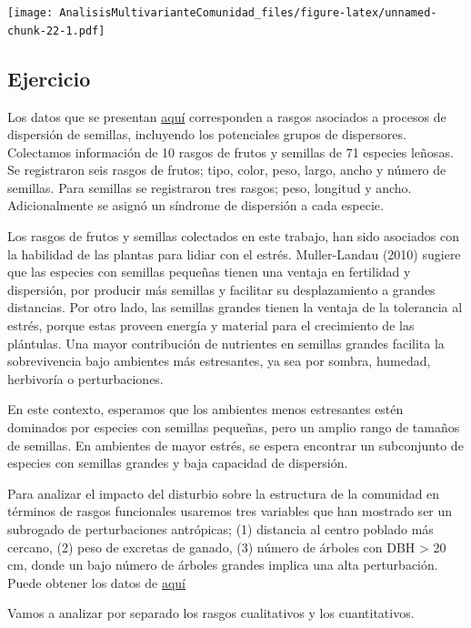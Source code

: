\documentclass[]{book}
\begin{document}
\texttt{[image: AnalisisMultivarianteComunidad\_files/figure-latex/unnamed-chunk-22-1.pdf]}

\subsection{Ejercicio}\label{ejercicio}

Los datos que se presentan
\href{https://github.com/Ciespinosa/AnalisisMultivariante/blob/gh-pages/TraitsVege.csv}{aquí}
corresponden a rasgos asociados a procesos de dispersión de semillas,
incluyendo los potenciales grupos de dispersores. Colectamos información
de 10 rasgos de frutos y semillas de 71 especies leñosas. Se registraron
seis rasgos de frutos; tipo, color, peso, largo, ancho y número de
semillas. Para semillas se registraron tres rasgos; peso, longitud y
ancho. Adicionalmente se asignó un síndrome de dispersión a cada
especie.

Los rasgos de frutos y semillas colectados en este trabajo, han sido
asociados con la habilidad de las plantas para lidiar con el estrés.
Muller-Landau (2010) sugiere que las especies con semillas pequeñas
tienen una ventaja en fertilidad y dispersión, por producir más semillas
y facilitar su desplazamiento a grandes distancias. Por otro lado, las
semillas grandes tienen la ventaja de la tolerancia al estrés, porque
estas proveen energía y material para el crecimiento de las plántulas.
Una mayor contribución de nutrientes en semillas grandes facilita la
sobrevivencia bajo ambientes más estresantes, ya sea por sombra,
humedad, herbivoría o perturbaciones.

En este contexto, esperamos que los ambientes menos estresantes estén
dominados por especies con semillas pequeñas, pero un amplio rango de
tamaños de semillas. En ambientes de mayor estrés, se espera encontrar
un subconjunto de especies con semillas grandes y baja capacidad de
dispersión.

Para analizar el impacto del disturbio sobre la estructura de la
comunidad en términos de rasgos funcionales usaremos tres variables que
han mostrado ser un subrogado de perturbaciones antrópicas; (1)
distancia al centro poblado más cercano, (2) peso de excretas de ganado,
(3) número de árboles con DBH \textgreater{} 20 cm, donde un bajo número
de árboles grandes implica una alta perturbación. Puede obtener los
datos de
\href{https://github.com/Ciespinosa/AnalisisMultivariante/blob/gh-pages/Parcelas.csv}{aquí}

Vamos a analizar por separado los rasgos cualitativos y los
cuantitativos.
\end{document}
